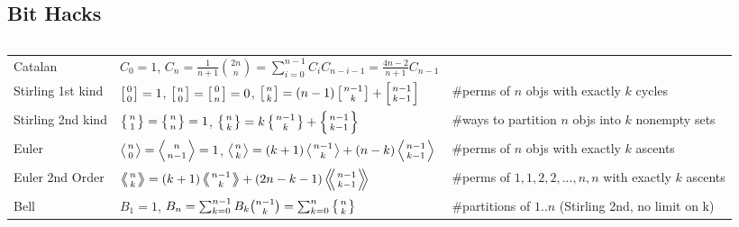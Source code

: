 \documentclass[9pt,a4paper,twocolumn,landscape,oneside]{amsart}
\newcommand{\code}[1]{\inputminted{cpp}{_code/#1}}
\begin{document}
    \subsection{Bit Hacks}
        \code{tricks/snoob.cpp}
    \begin{tabular}{@{}l|l|l@{}}
    \toprule
    Catalan	&	$C_0=1$, $C_n=\frac{1}{n+1}\binom{2n}{n} = \sum_{i=0}^{n-1}C_iC_{n-i-1} = \frac{4n-2}{n+1}C_{n-1}$  & \\
    Stirling 1st kind & $\left[{0\atop 0}\right]=1$, $\left[{n\atop 0}\right]=\left[{0\atop n}\right]=0$, $\left[{n\atop k}\right]=(n-1)\left[{n-1\atop k}\right]+\left[{n-1\atop k-1}\right]$ & \#perms of $n$ objs with exactly $k$ cycles\\
    Stirling 2nd kind & $\left\{{n\atop 1}\right\}=\left\{{n\atop n}\right\}=1$, $\left\{{n\atop k}\right\} = k \left\{{ n-1 \atop k }\right\} + \left\{{n-1\atop k-1}\right\}$ & \#ways to partition $n$ objs into $k$ nonempty sets\\
    Euler	& $\left \langle {n\atop 0} \right \rangle = \left \langle {n\atop n-1} \right \rangle = 1 $, $\left \langle {n\atop k} \right \rangle = (k+1) \left \langle {n-1\atop {k}} \right \rangle + (n-k)\left \langle {{n-1}\atop {k-1}} \right \rangle$ & \#perms of $n$ objs with exactly $k$ ascents \\
    Euler 2nd Order &  $\left \langle \!\!\left \langle {n\atop k} \right \rangle \!\! \right \rangle = (k+1) \left \langle \!\! \left \langle {{n-1}\atop {k}} \right \rangle \!\! \right \rangle +(2n-k-1)\left \langle \!\! \left \langle {{n-1}\atop {k-1}} \right \rangle  \!\! \right \rangle$ & \#perms of ${1,1,2,2,...,n,n}$ with exactly $k$ ascents \\
    Bell & $B_1 = 1$, $B_n = \sum_{k=0}^{n-1} B_k \binom{n-1}{k} = \sum_{k=0}^n\left\{{n\atop k}\right\}$ & \#partitions of $1..n$ (Stirling 2nd, no limit on k)\\
    \bottomrule
    \end{tabular}
\end{document}
